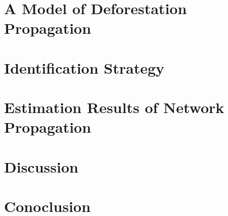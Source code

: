 \documentclass[a4paper,12pt]{article}
\begin{document}
\section{A Model of Deforestation Propagation}

\section{Identification Strategy}

\section{Estimation Results of Network Propagation}

\section{Discussion}

\section{Conoclusion}


\end{document}
